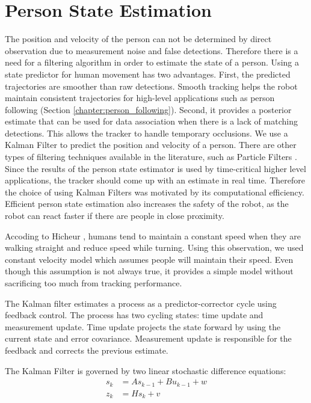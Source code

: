 \section{Person State Estimation}
\label{sec:multimodal_person_state_estimation}

The position and velocity of the person can not be determined by direct observation due to measurement noise and false detections. Therefore there is a need for a filtering algorithm in order to estimate the state of a person. Using a state predictor for human movement has two advantages. First, the predicted trajectories are smoother than raw detections. Smooth tracking helps the robot maintain consistent trajectories for high-level applications such as person following (Section \ref{chapter:person_following}). Second, it provides a posterior estimate that can be used for data association when there is a lack of matching detections. This allows the tracker to handle temporary occlusions. We use a Kalman Filter \cite{kalman1960new} to predict the position and velocity of a person. There are other types of filtering techniques available in the literature, such as Particle Filters \cite{khan2004mcmc}. Since the results of the person state estimator is used by time-critical higher level applications, the tracker should come up with an estimate in real time. Therefore the choice of using Kalman Filters was motivated by its computational efficiency. Efficient person state estimation also increases the safety of the robot, as the robot can react faster if there are people in close proximity.

Accoding to Hicheur \cite{hicheur2005velocity}, humans tend to maintain a constant speed when they are walking straight and reduce speed while turning. Using this observation, we used constant velocity model which assumes people will maintain their speed. Even though this assumption is not always true, it provides a simple model without sacrificing too much from tracking performance.

The Kalman filter estimates a process as a predictor-corrector cycle using feedback control. The process has two cycling states: time update and measurement update. Time update projects the state forward by using the current state and error covariance. Measurement update is responsible for the feedback and corrects the previous estimate.

The Kalman Filter is governed by two linear stochastic difference equations:
\begin{align}
s_k&=As_{k-1}+Bu_{k-1}+w \\
z_k&=Hs_k+v
\end{align}

